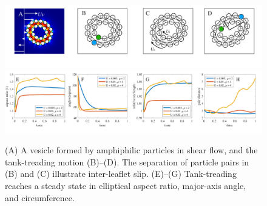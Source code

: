 \begin{figure}[!]
\begin{center}
\includegraphics[width=1\textwidth]{figures/PW_fig1A-D.pdf}
\includegraphics[width=1\textwidth]{figures/PW_fig1E-H.pdf}
\end{center}\vspace{-0.3in}
\caption{(A) A vesicle formed by amphiphilic particles in shear flow,
  and the tank-treading motion (B)--(D). The separation of particle
  pairs in (B) and (C) illustrate inter-leaflet slip.  (E)--(G)
  Tank-treading reaches a steady state in elliptical aspect ratio,
  major-axis angle, and circumference.}
\label{fig:tanktreading}
\end{figure}
